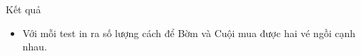 Kết quả  
\begin{itemize}
	\item     Với mỗi test in ra số lượng cách để Bờm và Cuội mua được hai vé ngồi cạnh nhau.   
\end{itemize}